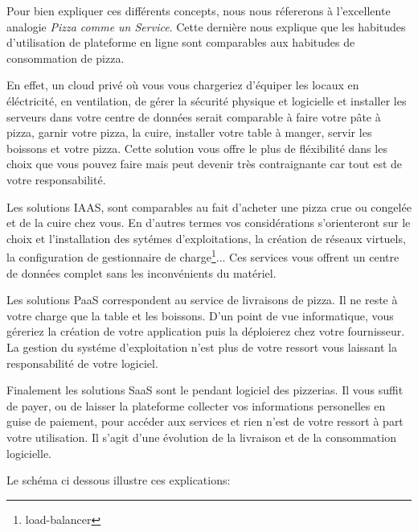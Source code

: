 \documentclass[11pt, a4paper ]{article}
\begin{document}
Pour bien expliquer ces différents concepts, nous nous réfererons à l'excellente analogie \emph{Pizza comme un Service}\cite{PizzaasaService}. Cette dernière nous explique que les habitudes d'utilisation de plateforme en ligne sont comparables aux habitudes de consommation de pizza.

En effet, un cloud privé où vous vous chargeriez d'équiper les locaux en éléctricité, en ventilation, de gérer la sécurité physique et logicielle et installer les serveurs dans votre centre de données serait comparable à faire votre pâte à pizza, garnir votre pizza, la cuire, installer votre table à manger, servir les boissons et votre pizza. Cette solution vous offre le plus de fléxibilité dans les choix que vous pouvez faire mais peut devenir très contraignante car tout est de votre responsabilité.

Les solutions IAAS, sont comparables au fait d'acheter une pizza crue ou congelée et de la cuire chez vous. En d'autres termes vos considérations s'orienteront sur le choix et l'installation des sytémes d'exploitations, la création de réseaux virtuels, la configuration de gestionnaire de charge\footnote{load-balancer}... Ces services vous offrent un centre de données complet sans les inconvénients du matériel.

Les solutions PaaS correspondent au service de livraisons de pizza. Il ne reste à votre charge que la table et les boissons. D'un point de vue informatique, vous géreriez la création de votre application puis la déploierez chez votre fournisseur. La gestion du systéme d'exploitation n'est plus de votre ressort vous laissant la responsabilité de votre logiciel.

Finalement les solutions SaaS sont le pendant logiciel des pizzerias. Il vous suffit de payer, ou de laisser la plateforme collecter vos informations personelles en guise de paiement, pour accéder aux services et rien n'est de votre ressort à part votre utilisation. Il s'agit d'une évolution de la livraison et de la consommation logicielle.

Le schéma ci dessous illustre ces explications:
\end{document}
